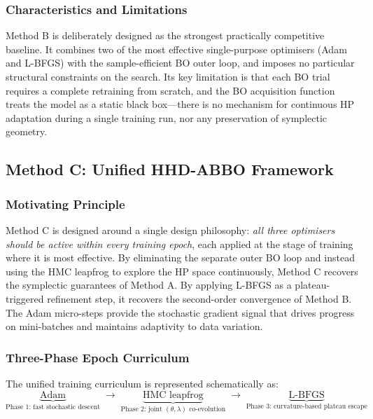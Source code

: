 \documentclass[12pt,a4paper]{article}
\begin{document}
\subsubsection{Characteristics and Limitations}

Method B is deliberately designed as the strongest practically
competitive baseline.  It combines two of the most effective
single-purpose optimisers (Adam and L-BFGS) with the sample-efficient
BO outer loop, and imposes no particular structural constraints on
the search.  Its key limitation is that each BO trial requires a
complete retraining from scratch, and the BO acquisition function
treats the model as a static black box—there is no mechanism for
continuous HP adaptation during a single training run, nor any
preservation of symplectic geometry.

\subsection{Method C: Unified HHD-ABBO Framework}

\subsubsection{Motivating Principle}

Method C is designed around a single design philosophy: \emph{all
three optimisers should be active within every training epoch}, each
applied at the stage of training where it is most effective.  By
eliminating the separate outer BO loop and instead using the HMC
leapfrog to explore the HP space continuously, Method C recovers the
symplectic guarantees of Method A.  By applying L-BFGS as a
plateau-triggered refinement step, it recovers the second-order
convergence of Method B.  The Adam micro-steps provide the stochastic
gradient signal that drives progress on mini-batches and maintains
adaptivity to data variation.

\subsubsection{Three-Phase Epoch Curriculum}

The unified training curriculum is represented schematically as:
\begin{equation}
\underbrace{\text{Adam}}_{\text{Phase 1:\ fast stochastic descent}}
\;\longrightarrow\;
\underbrace{\text{HMC leapfrog}}_{\text{Phase 2:\ joint }(\theta,\lambda)\text{ co-evolution}}
\;\longrightarrow\;
\underbrace{\text{L-BFGS}}_{\text{Phase 3:\ curvature-based plateau escape}}
\label{eq:curriculum}
\end{equation}
\end{document}
